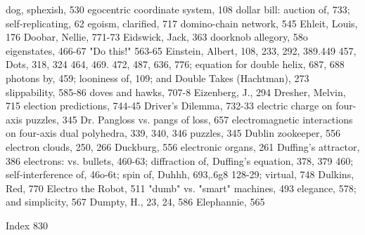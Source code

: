 dog, sphexish, 530                                   egocentric coordinate system, 108
dollar bill: auction of, 733; self-replicating, 62   egoism, clarified, 717
domino-chain network, 545                            Ehleit, Louis, 176
Doobar, Nellie, 771-73                               Eidswick, Jack, 363
doorknob allegory, 58o                               eigenstates, 466-67
"Do this!" 563-65                                    Einstein, Albert, 108, 233, 292, 389.449 457,
Dots, 318, 324                                        464, 469. 472, 487, 636, 776; equation for
double helix, 687, 688                                photons by, 459; looniness of, 109; and
Double Takes (Hachtman), 273                          slippability, 585-86
doves and hawks, 707-8                               Eizenberg, J., 294
Dresher, Melvin, 715                                 election predictions, 744-45
Driver's Dilemma, 732-33                             electric charge on four-axis puzzles, 345
Dr. Pangloss vs. pangs of loss, 657                   electromagnetic interactions on four-axis
dual polyhedra, 339, 340, 346                         puzzles, 345
Dublin zookeeper, 556                                electron clouds, 250, 266
Duckburg, 556                                        electronic organs, 261
Duffing's attractor, 386                             electrons: vs. bullets, 460-63; diffraction of,
Duffing's equation, 378, 379                          460; self-interference of, 46o-6t; spin of,
Duhhh, 693,.6g8                                       128-29; virtual, 748
Dulkins, Red, 770                                    Electro the Robot, 511
"dumb" vs. "smart" machines, 493                     elegance, 578; and simplicity, 567
Dumpty, H., 23, 24, 586                              Elephannie, 565

 Index                                                                                          830

